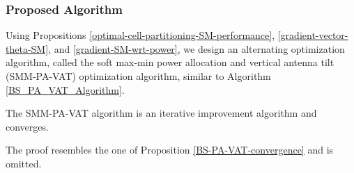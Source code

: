 \subsubsection{Proposed Algorithm}\label{SM-Algorithm}
Using Propositions \ref{optimal-cell-partitioning-SM-performance}, \ref{gradient-vector-theta-SM}, and \ref{gradient-SM-wrt-power}, we design an alternating optimization algorithm, called the soft max-min power allocation and vertical antenna tilt (SMM-PA-VAT) optimization algorithm, similar to Algorithm \ref{BS_PA_VAT_Algorithm}.


\begin{Proposition}\label{SMM-PA-VAT-convergence}
    The SMM-PA-VAT algorithm is an iterative improvement algorithm and converges.
\end{Proposition}
\noindent The proof resembles the one of Proposition \ref{BS-PA-VAT-convergence} and  is omitted. 

